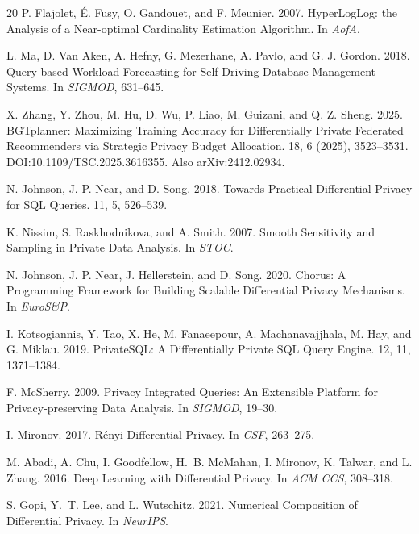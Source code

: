\documentclass[sigconf,nonacm]{acmart}
\begin{document}
\begin{thebibliography}{20}
P. Flajolet, \'E. Fusy, O. Gandouet, and F. Meunier. 2007.
\newblock HyperLogLog: the Analysis of a Near-optimal Cardinality Estimation Algorithm.
\newblock In {\em AofA}.

L. Ma, D. Van Aken, A. Hefny, G. Mezerhane, A. Pavlo, and G. J. Gordon. 2018.
\newblock Query-based Workload Forecasting for Self-Driving Database Management Systems.
\newblock In {\em SIGMOD}, 631--645.

X. Zhang, Y. Zhou, M. Hu, D. Wu, P. Liao, M. Guizani, and Q. Z. Sheng. 2025.
\newblock BGTplanner: Maximizing Training Accuracy for Differentially Private Federated Recommenders via Strategic Privacy Budget Allocation.
 18, 6 (2025), 3523--3531. DOI:10.1109/TSC.2025.3616355. Also arXiv:2412.02934.

N. Johnson, J. P. Near, and D. Song. 2018.
\newblock Towards Practical Differential Privacy for SQL Queries.
 11, 5, 526--539.

K. Nissim, S. Raskhodnikova, and A. Smith. 2007.
\newblock Smooth Sensitivity and Sampling in Private Data Analysis.
\newblock In {\em STOC}.

N. Johnson, J. P. Near, J. Hellerstein, and D. Song. 2020.
\newblock Chorus: A Programming Framework for Building Scalable Differential Privacy Mechanisms.
\newblock In {\em EuroS\&P}.

I. Kotsogiannis, Y. Tao, X. He, M. Fanaeepour, A. Machanavajjhala, M. Hay, and G. Miklau. 2019.
\newblock PrivateSQL: A Differentially Private SQL Query Engine.
 12, 11, 1371--1384.

F. McSherry. 2009.
\newblock Privacy Integrated Queries: An Extensible Platform for Privacy-preserving Data Analysis.
\newblock In {\em SIGMOD}, 19--30.

I. Mironov. 2017.
\newblock R\'{e}nyi Differential Privacy.
\newblock In {\em CSF}, 263--275.

M. Abadi, A. Chu, I. Goodfellow, H.~B. McMahan, I. Mironov, K. Talwar, and L. Zhang. 2016.
\newblock Deep Learning with Differential Privacy.
\newblock In {\em ACM CCS}, 308--318.

S. Gopi, Y.~T. Lee, and L. Wutschitz. 2021.
\newblock Numerical Composition of Differential Privacy.
\newblock In {\em NeurIPS}.


\end{thebibliography}
\end{document}
